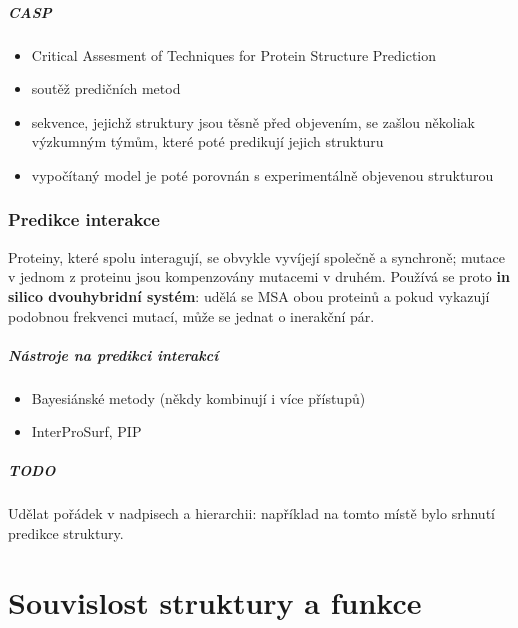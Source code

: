 \documentclass[DIV=8]{scrreprt}
\newcommand{\mybox}[2]{
    \paragraph{#1} #2
}
\begin{document}
\paragraph{CASP}
\begin{itemize}[nosep]
    \item Critical Assesment of Techniques for Protein Structure Prediction
    \item soutěž predičních metod
    \item sekvence, jejichž struktury jsou těsně před objevením, se zašlou několiak výzkumným týmům, které poté predikují jejich strukturu
    \item vypočítaný model je poté porovnán s experimentálně objevenou strukturou
\end{itemize}



\subsection{Predikce interakce} \label{Predikce interakce}


Proteiny, které spolu interagují, se obvykle vyvíjejí společně a synchroně; mutace v jednom z proteinu jsou kompenzovány mutacemi v druhém. Používá se proto \textbf{in silico dvouhybridní systém}: udělá se MSA obou proteinů a pokud vykazují podobnou frekvenci mutací, může se jednat o inerakční pár.

\paragraph{Nástroje na predikci interakcí}
\begin{itemize}[nosep]
    \item Bayesiánské metody (někdy kombinují i více přístupů)
    \item InterProSurf, PIP
\end{itemize}



\mybox{TODO}{Udělat pořádek v nadpisech a hierarchii: například na tomto místě bylo srhnutí predikce struktury.}


\chapter{Souvislost struktury a funkce} \label{Souvislost struktury a funkce}
\end{document}
